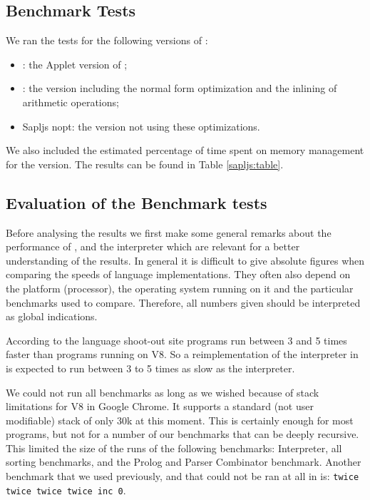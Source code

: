 \subsection{Benchmark Tests}
We ran the tests for the following versions of \Sapl: 
\begin{itemize}
\item{\Sapl}: the \Java Applet version of \Sapl;
\item{\Sapljs}: the \Sapljs version including the normal form optimization and the inlining of arithmetic operations;
\item{\textsf{Sapljs nopt}}: the version not using these optimizations.
\end{itemize}
We also  included the estimated percentage of time spent on memory management for the \Sapljs version.
The results can be found in Table \ref{sapljs:table}.

\vspace{-1cm}

\subsection{Evaluation of the Benchmark tests}
Before analysing the results we first make some general remarks about the performance of \Java, \JS and the \Sapl interpreter which are relevant for
a better understanding of the results. In general it is difficult to give absolute figures when comparing the speeds of language implementations. 
They often also depend on the platform (processor), the operating system running on it and the particular benchmarks used to compare. 
Therefore, all numbers given should be interpreted as global indications. 

According to the language shoot-out site \cite{SHOOTOUT} \Java 
programs run between 3 and 5 times faster than \JS programs running on V8. 
So a reimplementation of the \Sapl interpreter in \JS is expected to run between 3 to 5 times as slow as the \Sapl interpreter.


We could not run all benchmarks as long as we wished because of stack limitations for V8 \JS in Google Chrome. 
It supports a standard (not user modifiable) stack of only 30k at this moment.
This is certainly enough for most \JS programs, but not for a number of our benchmarks that can be deeply recursive. 
This limited the size of the runs of the following benchmarks: \textsf{Interpreter}, 
all sorting benchmarks, and the \textsf{Prolog} and \textsf{Parser Combinator} benchmark. 
Another benchmark that we used previously, and that could not be ran at all  in \Sapljs is:  \texttt{twice twice twice twice inc 0}.

